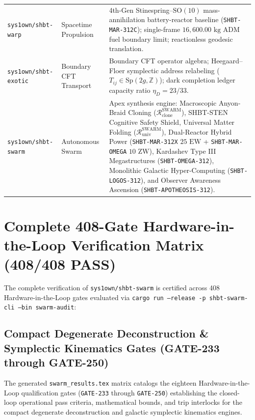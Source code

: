 \documentclass[11pt,onecolumn]{article}
\begin{document}
\begin{table}[!htbp]
{\begin{tabularx}{\linewidth}{@{}p{3.6cm} p{3.0cm} X@{}}
\addlinespace
\texttt{sys1own/shbt-warp} & Spacetime Propulsion & 4th-Gen Stinespring--$\text{SO}(10)$ mass-annihilation battery-reactor baseline (\texttt{SHBT-MAR-312C}); single-frame $16{,}600.00\text{ kg}$ ADM fuel boundary limit; reactionless geodesic translation. \\
\addlinespace
\texttt{sys1own/shbt-exotic} & Boundary CFT Transport & Boundary CFT operator algebra; Heegaard--Floer symplectic address relabeling ($T_{ij} \in \text{Sp}(2g, \mathbb{Z})$); dark completion ledger capacity ratio $\eta_D = 23/33$. \\
\addlinespace
\texttt{sys1own/shbt-swarm} & Autonomous Swarm & Apex synthesis engine: Macroscopic Anyon-Braid Cloning ($\mathcal{R}_{\text{clone}}^{\text{SWARM}}$), SHBT-STEN Cognitive Safety Shield, Universal Matter Folding ($\mathcal{R}_{\text{univ}}^{\text{SWARM}}$), Dual-Reactor Hybrid Power (\texttt{SHBT-MAR-312X} $25\text{ EW}$ + \texttt{SHBT-MAR-OMEGA} $10\text{ ZW}$), Kardashev Type III Megastructures (\texttt{SHBT-OMEGA-312}), Monolithic Galactic Hyper-Computing (\texttt{SHBT-LOGOS-312}), and Observer Awareness Ascension (\texttt{SHBT-APOTHEOSIS-312}). \\
\bottomrule
\end{tabularx}%
}
\end{table}
\FloatBarrier
\appendix
\section{Complete 408-Gate Hardware-in-the-Loop Verification Matrix (408/408 PASS)}
\label{sec:hil_matrix_320}
The complete verification of \texttt{sys1own/shbt-swarm} is certified across 408 Hardware-in-the-Loop gates evaluated via \texttt{cargo run --release -p shbt-swarm-cli --bin swarm-audit}:

\FloatBarrier

\FloatBarrier

\subsection{Compact Degenerate Deconstruction \& Symplectic Kinematics Gates (GATE-233 through GATE-250)}
\label{subsec:gate_233_250_table}
The generated \texttt{swarm\_results.tex} matrix catalogs the eighteen Hardware-in-the-Loop qualification gates (\texttt{GATE-233} through \texttt{GATE-250}) establishing the closed-loop operational pass criteria, mathematical bounds, and trip interlocks for the compact degenerate deconstruction and galactic symplectic kinematics engines.
\end{document}
